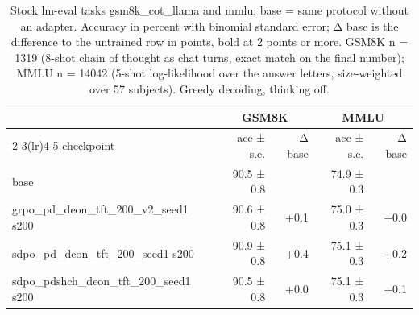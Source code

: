 \begin{table}[t]
\centering
\caption{Stock lm-eval tasks gsm8k_cot_llama and mmlu; base = same protocol without an adapter. Accuracy in percent with binomial standard error; Δ base is the difference to the untrained row in points, bold at 2 points or more. GSM8K n = 1319 (8-shot chain of thought as chat turns, exact match on the final number); MMLU n = 14042 (5-shot log-likelihood over the answer letters, size-weighted over 57 subjects). Greedy decoding, thinking off.}
\label{tab:T1-retention}
\small
\setlength{\tabcolsep}{3.5pt}
\begin{tabular}{lrrrr}
\toprule
 & \multicolumn{2}{c}{GSM8K} & \multicolumn{2}{c}{MMLU} \\
\cmidrule(lr){2-3}\cmidrule(lr){4-5}
checkpoint & acc ± s.e. & Δ base & acc ± s.e. & Δ base \\
\midrule
base & 90.5 ± 0.8 &  & 74.9 ± 0.3 &  \\
grpo_pd_deon_tft_200_v2_seed1 s200 & 90.6 ± 0.8 & +0.1 & 75.0 ± 0.3 & +0.0 \\
sdpo_pd_deon_tft_200_seed1 s200 & 90.9 ± 0.8 & +0.4 & 75.1 ± 0.3 & +0.2 \\
sdpo_pdshch_deon_tft_200_seed1 s200 & 90.5 ± 0.8 & +0.0 & 75.1 ± 0.3 & +0.1 \\
\bottomrule
\end{tabular}
\end{table}

